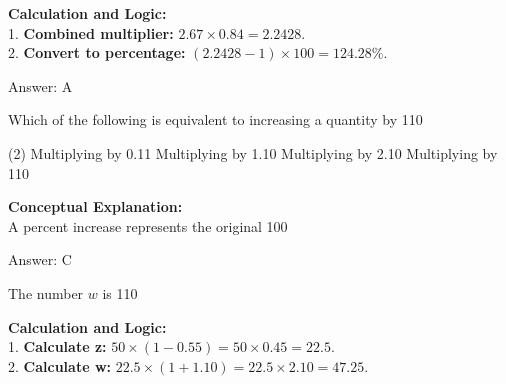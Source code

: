 \documentclass[11pt,paper=a4,answers]{exam}
\begin{document}
\begin{questions}
\begin{solution}
\vspace{30pt}
\begin{center}
\end{center}
\vspace{30pt}

\textbf{Calculation and Logic:} \\
1. \textbf{Combined multiplier:} $2.67 \times 0.84 = 2.2428$. \\
2. \textbf{Convert to percentage:} $(2.2428 - 1) \times 100 = 124.28\%$.

\vspace{30pt}

Answer: \colorbox{yellow!100}{A}
\end{solution}

\vspace{60pt}

\question
Which of the following is equivalent to increasing a quantity by 110%
\begin{tasks}(2)
    \task Multiplying by 0.11
    \task Multiplying by 1.10
    \task Multiplying by 2.10
    \task Multiplying by 110
\end{tasks}

\begin{solution}
\textbf{Conceptual Explanation:} \\
A percent increase represents the original 100%

\vspace{30pt}

Answer: \colorbox{yellow!100}{C}
\end{solution}

\vspace{60pt}

\question
The number $w$ is 110%

\begin{solution}
\textbf{Calculation and Logic:} \\
1. \textbf{Calculate z:} $50 \times (1 - 0.55) = 50 \times 0.45 = 22.5$. \\
2. \textbf{Calculate w:} $22.5 \times (1 + 1.10) = 22.5 \times 2.10 = 47.25$.


\end{solution}
\end{questions}
\end{document}
